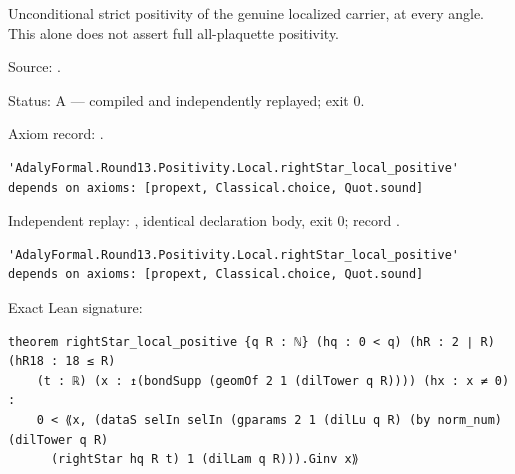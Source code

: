 \begin{theorem}[bp-448]
\label{bp-448}
\leanok
Unconditional strict positivity of the genuine localized carrier, at every angle. This alone does not assert full all-plaquette positivity.

\par Source: \texttt{}.
\par Status: A — compiled and independently replayed; exit 0.
\par Axiom record: \texttt{}.
\begin{verbatim}
'AdalyFormal.Round13.Positivity.Local.rightStar_local_positive' depends on axioms: [propext, Classical.choice, Quot.sound]
\end{verbatim}
\par Independent replay: \texttt{}, identical declaration body, exit 0; record \texttt{}.
\begin{verbatim}
'AdalyFormal.Round13.Positivity.Local.rightStar_local_positive' depends on axioms: [propext, Classical.choice, Quot.sound]
\end{verbatim}
\par Exact Lean signature:
\begin{verbatim}
theorem rightStar_local_positive {q R : ℕ} (hq : 0 < q) (hR : 2 ∣ R) (hR18 : 18 ≤ R)
    (t : ℝ) (x : ↥(bondSupp (geomOf 2 1 (dilTower q R)))) (hx : x ≠ 0) :
    0 < ⟪x, (dataS selIn selIn (gparams 2 1 (dilLu q R) (by norm_num) (dilTower q R)
      (rightStar hq R t) 1 (dilLam q R))).Ginv x⟫
\end{verbatim}
\end{theorem}

